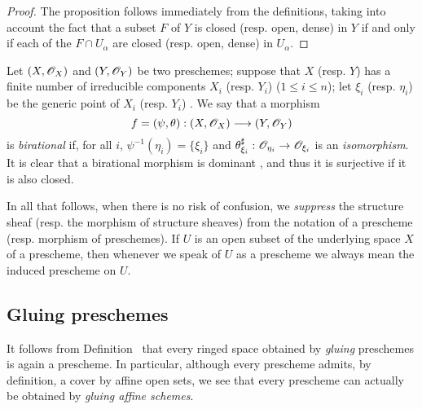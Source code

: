 \begin{proof}
\label{proof-1.2.2.8}
The proposition follows immediately from the definitions, taking into account the fact that a subset $F$ of $Y$ is closed (resp. open, dense) in $Y$ if and only if each of the $F\cap U_\alpha$ are closed (resp. open, dense) in $U_\alpha$.
\end{proof}

\begin{env}[2.2.9]
\label{I.2.2.9}
Let $(X,\mathscr{O}_X)$ and $(Y,\mathscr{O}_Y)$ be two preschemes;
suppose that $X$ (resp. $Y$) has a finite number of irreducible components $X_i$ (resp. $Y_i$) ($1\leq i\leq n$);
let $\xi_i$ (resp. $\eta_i$) be the generic point of $X_i$ (resp. $Y_i$) .
We say that a morphism
\[
  f=(\psi,\theta):(X,\sh{O}_X)\to(Y,\sh{O}_Y)
\]
is \emph{birational} if, for all $i$, $\psi^{-1}(\eta_i)=\{\xi_i\}$ and $\theta_{\xi_i}^\sharp:\sh{O}_{\eta_i}\to\sh{O}_{\xi_i}$ is an \emph{isomorphism}.
It is clear that a birational morphism is dominant , and thus it is surjective if it is also closed.
\end{env}

\begin{notation}[2.2.10]
\label{I.2.2.10}
In all that follows, when there is no risk of confusion, we \emph{suppress} the structure sheaf (resp. the morphism of structure sheaves) from the notation of a prescheme (resp. morphism of preschemes).
If $U$ is an open subset of the underlying space $X$ of a prescheme, then whenever we speak of $U$ as a prescheme we always mean the induced prescheme on $U$.
\end{notation}

\subsection{Gluing preschemes}
\label{subsection:I.2.3}

\begin{env}[2.3.1]
\label{I.2.3.1}
It follows from Definition~ that every ringed space obtained by \emph{gluing} preschemes  is again a prescheme.
In particular, although every prescheme admits, by definition, a cover by affine open sets, we see that every prescheme can actually be obtained by \emph{gluing affine schemes}.
\end{env}

